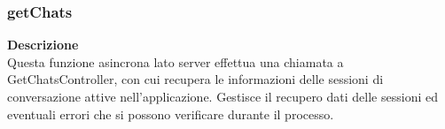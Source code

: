 \subsubsection{getChats}
\textbf{Descrizione}\\
Questa funzione asincrona lato server effettua una chiamata a GetChatsController, con cui recupera le informazioni delle sessioni di conversazione attive nell'applicazione. Gestisce il recupero dati delle sessioni ed eventuali errori che si possono verificare durante il processo.

\newpage

\newpage
